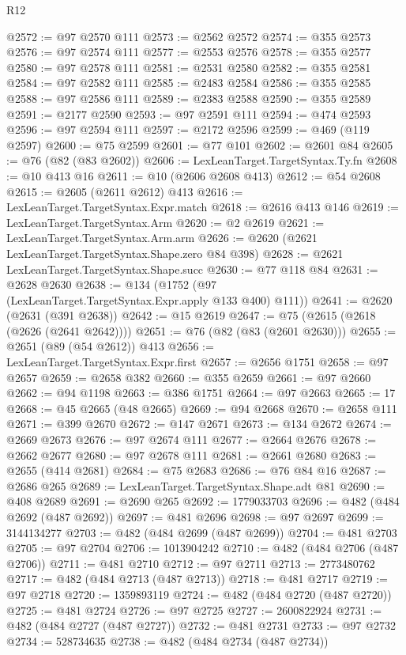 \begin{lexlean}{R12}
\begin{coremodule}
{{{{{{{{{{{{{{{{{{{{{{{{{{{{{{{{{{{{{{{{{{{{{{{{{{{{{{{{{{{{{{{{{{{{{{{{{{{{{{{{{{@2572 := @97 @2570 @111
@2573 := @2562 @2572
@2574 := @355 @2573
@2576 := @97 @2574 @111
@2577 := @2553 @2576
@2578 := @355 @2577
@2580 := @97 @2578 @111
@2581 := @2531 @2580
@2582 := @355 @2581
@2584 := @97 @2582 @111
@2585 := @2483 @2584
@2586 := @355 @2585
@2588 := @97 @2586 @111
@2589 := @2383 @2588
@2590 := @355 @2589
@2591 := @2177 @2590
@2593 := @97 @2591 @111
@2594 := @474 @2593
@2596 := @97 @2594 @111
@2597 := @2172 @2596
@2599 := @469 (@119 @2597)
@2600 := @75 @2599
@2601 := @77 @101
@2602 := @2601 @84
@2605 := @76 (@82 (@83 @2602))
@2606 := LexLeanTarget.TargetSyntax.Ty.fn
@2608 := @10 @413 @16
@2611 := @10 (@2606 @2608 @413)
@2612 := @54 @2608
@2615 := @2605 (@2611 @2612) @413
@2616 := LexLeanTarget.TargetSyntax.Expr.match
@2618 := @2616 @413 @146
@2619 := LexLeanTarget.TargetSyntax.Arm
@2620 := @2 @2619
@2621 := LexLeanTarget.TargetSyntax.Arm.arm
@2626 := @2620 (@2621 LexLeanTarget.TargetSyntax.Shape.zero @84 @398)
@2628 := @2621 LexLeanTarget.TargetSyntax.Shape.succ
@2630 := @77 @118 @84
@2631 := @2628 @2630
@2638 := @134 (@1752 (@97 (LexLeanTarget.TargetSyntax.Expr.apply @133 @400) @111))
@2641 := @2620 (@2631 (@391 @2638))
@2642 := @15 @2619
@2647 := @75 (@2615 (@2618 (@2626 (@2641 @2642))))
@2651 := @76 (@82 (@83 (@2601 @2630)))
@2655 := @2651 (@89 (@54 @2612)) @413
@2656 := LexLeanTarget.TargetSyntax.Expr.first
@2657 := @2656 @1751
@2658 := @97 @2657
@2659 := @2658 @382
@2660 := @355 @2659
@2661 := @97 @2660
@2662 := @94 @1198
@2663 := @386 @1751
@2664 := @97 @2663
@2665 := 17
@2668 := @45 @2665 (@48 @2665)
@2669 := @94 @2668
@2670 := @2658 @111
@2671 := @399 @2670
@2672 := @147 @2671
@2673 := @134 @2672
@2674 := @2669 @2673
@2676 := @97 @2674 @111
@2677 := @2664 @2676
@2678 := @2662 @2677
@2680 := @97 @2678 @111
@2681 := @2661 @2680
@2683 := @2655 (@414 @2681)
@2684 := @75 @2683
@2686 := @76 @84 @16
@2687 := @2686 @265
@2689 := LexLeanTarget.TargetSyntax.Shape.adt @81
@2690 := @408 @2689
@2691 := @2690 @265
@2692 := 1779033703
@2696 := @482 (@484 @2692 (@487 @2692))
@2697 := @481 @2696
@2698 := @97 @2697
@2699 := 3144134277
@2703 := @482 (@484 @2699 (@487 @2699))
@2704 := @481 @2703
@2705 := @97 @2704
@2706 := 1013904242
@2710 := @482 (@484 @2706 (@487 @2706))
@2711 := @481 @2710
@2712 := @97 @2711
@2713 := 2773480762
@2717 := @482 (@484 @2713 (@487 @2713))
@2718 := @481 @2717
@2719 := @97 @2718
@2720 := 1359893119
@2724 := @482 (@484 @2720 (@487 @2720))
@2725 := @481 @2724
@2726 := @97 @2725
@2727 := 2600822924
@2731 := @482 (@484 @2727 (@487 @2727))
@2732 := @481 @2731
@2733 := @97 @2732
@2734 := 528734635
@2738 := @482 (@484 @2734 (@487 @2734))
}}}}}}}}}}}}}}}}}}}}}}}}}}}}}}}}}}}}}}}}}}}}}}}}}}}}}}}}}}}}}}}}}}}}}}}}}}}}}}}}}}
\end{coremodule}
\end{lexlean}
